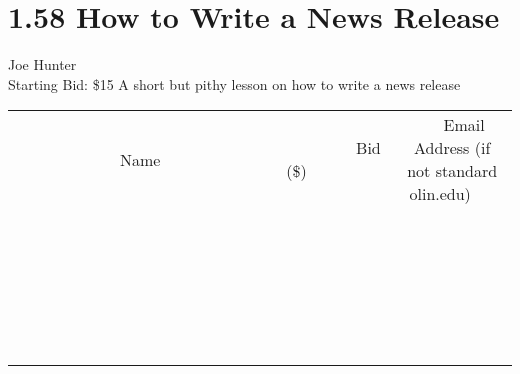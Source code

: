 \documentclass[11pt]{article}
\begin{document}
\section*{1.58 How to Write a News Release }
Joe Hunter
\\
Starting Bid: \$15
\newline
A short but pithy lesson on how to write a news release
\\[6ex]
\begin{tabular}{c c c}
~~~~~~~~~~~~~Name~~~~~~~~~~~~~ & ~~~~~~~~~Bid (\$)~~~~~~~~~  & ~~~Email Address (if not standard olin.edu)~~~\\
 & & \\
\hline
 & & \\
\hline
 & & \\
\hline
 & & \\
\hline
 & & \\
\hline
 & & \\
\hline
 & & \\
\hline
 & & \\
\hline
 & & \\
\hline
 & & \\
\hline
 & & \\
\hline
 & & \\
\hline
 & & \\
\hline
 & & \\
\hline
 & & \\
\hline
 & & \\
\hline
 & & \\
\hline
 & & \\
\hline
 & & \\
\hline
 & & \\
\hline
 & & \\
\hline
 & & \\
\hline
 & & \\
\hline
 & & \\
\hline
 & & \\
\hline
 & & \\
\hline
\end{tabular}
\newpage
\end{document}

